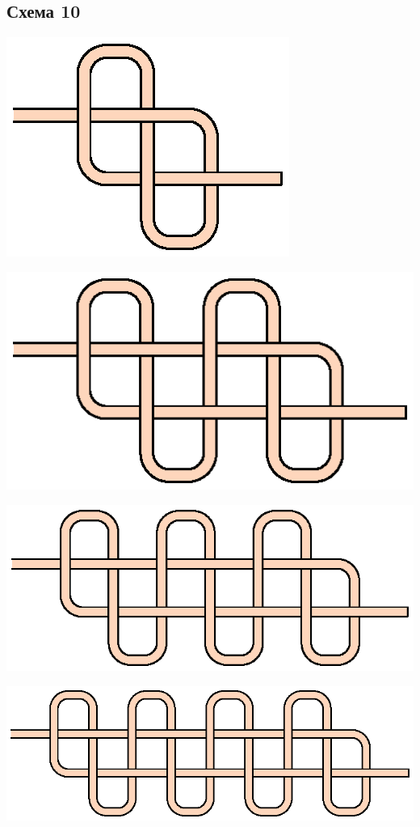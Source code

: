 \subsection{Схема 10}
\graphicspath{{\currentpath}}

\includegraphics{images/s-10-a0.eps}

\includegraphics{images/s-10-a1.eps}

\includegraphics{images/s-10-a2.eps}

\includegraphics{images/s-10-a3.eps}
